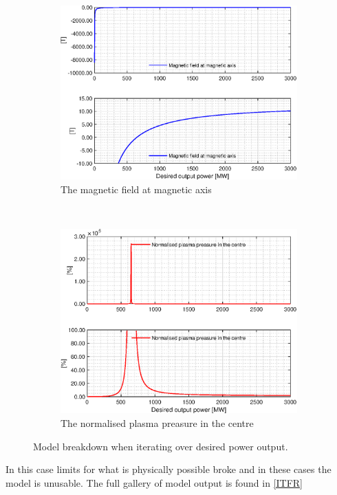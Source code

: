 \begin{figure}
	\centering
  \begin{subfigure}[h!]{.45\textwidth}
    \includegraphics[width=\textwidth]{MatlabFigures/PE/f7.eps}
    \caption{The magnetic field at magnetic axis\vspace{\baselineskip}}
    \label{PEM}
  \end{subfigure}
  ~
  \begin{subfigure}[h!]{.45\textwidth}
    \includegraphics[width=\textwidth]{MatlabFigures/PE/f8.eps}
    \caption{The normalised plasma preasure in the centre}
    \label{PEB}
  \end{subfigure}
	\caption{Model breakdown when iterating over desired power output.}
	\label{PE}
\end{figure}
In this case limits for what is physically possible broke and in these cases the model is unusable.
The full gallery of model output is found in \cref{ITFR}
